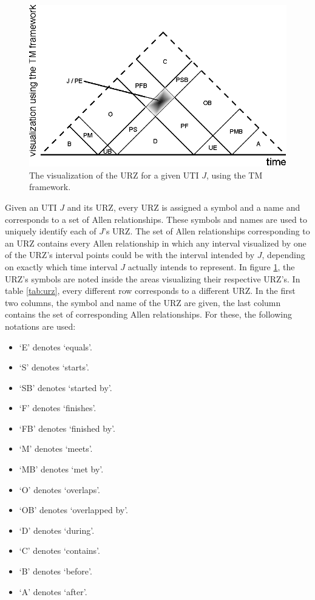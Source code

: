 \begin{figure}[h]
	\centering
	\includegraphics[width=0.8\columnwidth]{graphs/TM_model_URZ.eps}
	\caption{The visualization of the URZ for a given UTI $J$, using the TM framework.}
	\label{fig:tm-urz}
\end{figure}

Given an UTI $J$ and its URZ, every URZ is assigned a symbol and a name and corresponds to a set of Allen relationships. These symbols and names are used to uniquely identify each of $J$'s URZ. The set of Allen relationships corresponding to an URZ contains every Allen relationship in which any interval visualized by one of the URZ's interval points could be with the interval intended by $J$, depending on exactly which time interval $J$ actually intends to represent. In figure \ref{fig:tm-urz}, the URZ's symbols are noted inside the areas visualizing their respective URZ's. In table \ref{tab:urz}, every different row corresponds to a different URZ. In the first two columns, the symbol and name of the URZ are given, the last column contains the set of corresponding Allen relationships. For these, the following notations are used:

\begin{itemize}
	\item `E' denotes `equals'.
	\item `S' denotes `starts'.
	\item `SB' denotes `started by'.
	\item `F' denotes `finishes'.
	\item `FB' denotes `finished by'.
	\item `M' denotes `meets'.
	\item `MB' denotes `met by'.
	\item `O' denotes `overlaps'.
	\item `OB' denotes `overlapped by'.
	\item `D' denotes `during'.
	\item `C' denotes `contains'.
	\item `B' denotes `before'.
	\item `A' denotes `after'.
\end{itemize}

